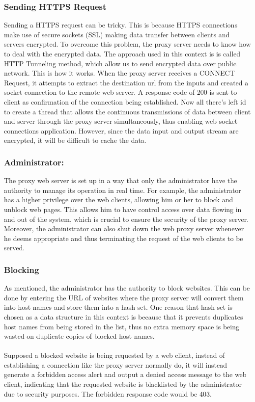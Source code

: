 \documentclass[12pt]{article}%
\begin{document}
\subsubsection*{Sending HTTPS Request}
Sending a HTTPS request can be tricky. This is because HTTPS connections make use of secure sockets (SSL) making data transfer between clients and servers encrypted. To overcome this problem, the proxy server needs to know how to deal with the encrypted data. The approach used in this context is is called HTTP Tunneling method, which allow us to send encrypted data over public network. This is how it works. When the proxy server receives a CONNECT Request, it attempts to extract the destination url from the inputs and created a socket connection to the remote web server. A response code of 200 is sent to client as confirmation of the connection being established. Now all there's left id to create a thread that allows the continuous transmissions of data between client and server through the proxy server simultaneously, thus enabling web socket connections application. However, since the data input and output stream are encrypted, it will be difficult to cache the data. \\
\subsubsection*{Administrator:}
The proxy web server is set up in a way that only the administrator have the authority to manage its operation in real time. For example, the administrator has a higher privilege over the web clients, allowing him or her to block and unblock web pages. This allows him to have control access over data flowing in and out of the system, which is crucial to ensure the security of the proxy server. Moreover, the administrator can also shut down the web proxy server whenever he deems appropriate and thus terminating the request of the web clients to be served. \\
\subsubsection*{Blocking}
As mentioned, the administrator has the authority to block websites. This can be done by entering the URL of websites where the proxy server will convert them into host names and store them into a hash set. One reason that hash set is chosen as a data structure in this context is because that it prevents duplicates host names from being stored in the list, thus no extra memory space is being wasted on duplicate copies of blocked host names. \\ \\
Supposed a blocked website is being requested by a web client, instead of establishing a connection like the proxy server normally do, it will instead generate a forbidden access alert and output a denied access message to the web client, indicating that the requested website is blacklisted by the administrator due to security purposes. The forbidden response code would be 403. \\
\end{document}

